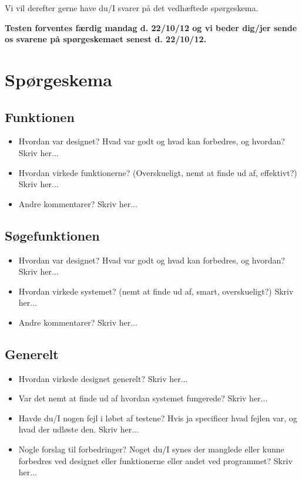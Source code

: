 Vi vil derefter gerne have du/I svarer på det vedhæftede spørgeskema.	

\textbf{Testen forventes færdig mandag d. 22/10/12 og vi beder dig/jer sende os svarene på spørgeskemaet senest d. 22/10/12.}

\section*{Spørgeskema}
\subsection*{Funktionen}
\begin{itemize}
\item Hvordan var designet? Hvad var godt og hvad kan forbedres, og hvordan?
\newline
Skriv her...
\item Hvordan virkede funktionerne? (Overskueligt, nemt at finde ud af, effektivt?)
\newline
Skriv her...
\item Andre kommentarer?
\newline
Skriv her...
\end{itemize}

\subsection*{Søgefunktionen}
\begin{itemize}
\item Hvordan var designet? Hvad var godt og hvad kan forbedres, og hvordan?
\newline
Skriv her...
\item Hvordan virkede systemet? (nemt at finde ud af, smart, overskueligt?)
\newline
Skriv her...
\item Andre kommentarer?
\newline
Skriv her...
\end{itemize}

\subsection*{Generelt}
\begin{itemize}
\item Hvordan virkede designet generelt?
\newline
Skriv her...
\item Var det nemt at finde ud af hvordan systemet fungerede?
\newline
Skriv her...
\item Havde du/I nogen fejl i løbet af testene? Hvis ja specificer hvad fejlen var, og hvad der udløste den.
\newline
Skriv her...
\item Nogle forslag til forbedringer? Noget du/I synes der manglede eller kunne forbedres ved designet eller funktionerne eller andet ved programmet?
\newline
Skriv her...
\end{itemize}